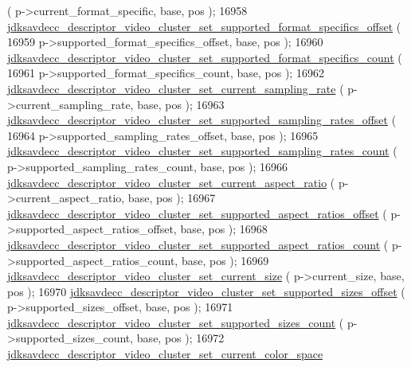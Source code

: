 \begin{DoxyCode}
      ( p->current\_format\_specific, base, pos );
16958         
      \hyperlink{group__descriptor__video__cluster_ga864e74a736357aa426e4cc6d7b1d0949}{jdksavdecc\_descriptor\_video\_cluster\_set\_supported\_format\_specifics\_offset}
      (
16959             p->supported\_format\_specifics\_offset, base, pos );
16960         \hyperlink{group__descriptor__video__cluster_gac7230d70ddc2aaebb011eba1e80d82ed}{jdksavdecc\_descriptor\_video\_cluster\_set\_supported\_format\_specifics\_count}
      (
16961             p->supported\_format\_specifics\_count, base, pos );
16962         \hyperlink{group__descriptor__video__cluster_gaa121797683aa48d916ed8479214781c0}{jdksavdecc\_descriptor\_video\_cluster\_set\_current\_sampling\_rate}
      ( p->current\_sampling\_rate, base, pos );
16963         \hyperlink{group__descriptor__video__cluster_gae7efac92409d5a34d5e55f5981694d95}{jdksavdecc\_descriptor\_video\_cluster\_set\_supported\_sampling\_rates\_offset}
      (
16964             p->supported\_sampling\_rates\_offset, base, pos );
16965         \hyperlink{group__descriptor__video__cluster_ga44f6c80d4dbaa7716d09f6b755e2434a}{jdksavdecc\_descriptor\_video\_cluster\_set\_supported\_sampling\_rates\_count}
      ( p->supported\_sampling\_rates\_count, base, pos );
16966         \hyperlink{group__descriptor__video__cluster_ga4ffa3750540e67a7fb0814d16d85477f}{jdksavdecc\_descriptor\_video\_cluster\_set\_current\_aspect\_ratio}
      ( p->current\_aspect\_ratio, base, pos );
16967         \hyperlink{group__descriptor__video__cluster_ga5268f0f1cca2120270020ab983bbaa69}{jdksavdecc\_descriptor\_video\_cluster\_set\_supported\_aspect\_ratios\_offset}
      ( p->supported\_aspect\_ratios\_offset, base, pos );
16968         \hyperlink{group__descriptor__video__cluster_ga1f7cdeef7a57630e8694a159140fb0f4}{jdksavdecc\_descriptor\_video\_cluster\_set\_supported\_aspect\_ratios\_count}
      ( p->supported\_aspect\_ratios\_count, base, pos );
16969         \hyperlink{group__descriptor__video__cluster_ga6113d86ac6d7525a64b5fe054bd1e11e}{jdksavdecc\_descriptor\_video\_cluster\_set\_current\_size}
      ( p->current\_size, base, pos );
16970         \hyperlink{group__descriptor__video__cluster_ga25210e111227e412ab15475ccc6ab85d}{jdksavdecc\_descriptor\_video\_cluster\_set\_supported\_sizes\_offset}
      ( p->supported\_sizes\_offset, base, pos );
16971         \hyperlink{group__descriptor__video__cluster_gaae080ce62cee3e62f522f8d7ea86c8a6}{jdksavdecc\_descriptor\_video\_cluster\_set\_supported\_sizes\_count}
      ( p->supported\_sizes\_count, base, pos );
16972         \hyperlink{group__descriptor__video__cluster_ga7ad6f40ef335f1ab5d53b8842a368b6e}{jdksavdecc\_descriptor\_video\_cluster\_set\_current\_color\_space}

\end{DoxyCode}
